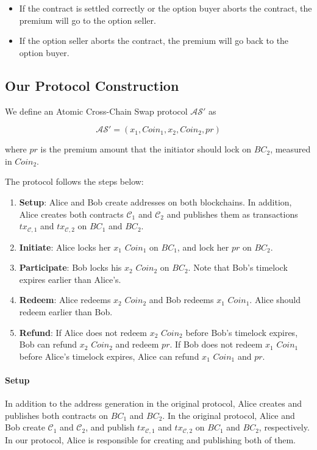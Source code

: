 \begin{itemize}
    \item If the contract is settled correctly or the option buyer aborts the contract, the premium will go to the option seller.
    \item If the option seller aborts the contract, the premium will go back to the option buyer.
\end{itemize}


\subsection{Our Protocol Construction}

We define an Atomic Cross-Chain Swap protocol $\mathcal{AS}'$ as

$$\mathcal{AS}' = (x_1, Coin_1, x_2, Coin_2, pr)$$

where $pr$ is the premium amount that the initiator should lock on $BC_2$, measured in $Coin_2$.

The protocol follows the steps below:

\begin{enumerate}
    \item \textbf{Setup}: Alice and Bob create addresses on both blockchains.
    In addition, Alice creates both contracts $\mathcal{C}_1$ and $\mathcal{C}_2$ and publishes them as transactions $tx_{\mathcal{C}, 1}$ and $tx_{\mathcal{C}, 2}$ on $BC_1$ and $BC_2$. 
    \item \textbf{Initiate}: Alice locks her $x_1$ $Coin_1$ on $BC_1$, and lock her $pr$ on $BC_2$.
    \item \textbf{Participate}: Bob locks his $x_2$ $Coin_2$ on $BC_2$. Note that Bob's timelock expires earlier than Alice's.
    \item \textbf{Redeem}: Alice redeems $x_2$ $Coin_2$ and Bob redeems $x_1$ $Coin_1$. Alice should redeem earlier than Bob.
    \item \textbf{Refund}: If Alice does not redeem $x_2$ $Coin_2$ before Bob's timelock expires, Bob can refund $x_2$ $Coin_2$ and redeem $pr$.
    If Bob does not redeem $x_1$ $Coin_1$ before Alice's timelock expires, Alice can refund $x_1$ $Coin_1$ and $pr$.
\end{enumerate}

\paragraph{Setup}
In addition to the address generation in the original protocol,
Alice creates and publishes both contracts on $BC_1$ and $BC_2$.
In the original protocol, Alice and Bob create $\mathcal{C}_1$ and $\mathcal{C}_2$, and publish $tx_{\mathcal{C}, 1}$ and $tx_{\mathcal{C}, 2}$ on $BC_1$ and $BC_2$, respectively.
In our protocol, Alice is responsible for creating and publishing both of them.

